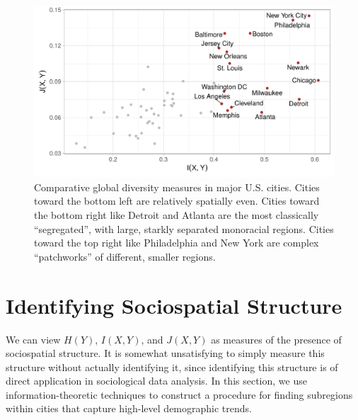 \documentclass[english]{scrartcl}
\begin{document}
			\begin{figure}
				\includegraphics[width=\textwidth]{figs/mutual_fisher.pdf}
				\caption{Comparative global diversity measures in major U.S. cities. Cities toward the bottom left are relatively spatially even. Cities toward the bottom right like Detroit and Atlanta are the most classically ``segregated'', with large, starkly separated monoracial regions. Cities toward the top right like Philadelphia and New York are complex ``patchworks'' of different, smaller regions.} \label{fig:mutual_fisher}
			\end{figure}


\section{Identifying Sociospatial Structure} \label{sec:id}

	We can view $H(Y)$, $I(X,Y)$, and $J(X,Y)$ as measures of the presence of sociospatial structure. It is somewhat unsatisfying to simply measure this structure without actually identifying it, since identifying this structure is of direct application in sociological data analysis. In this section, we use information-theoretic techniques to construct a procedure for finding subregions within cities that capture high-level demographic trends. 
\end{document}
